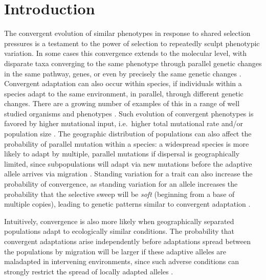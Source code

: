 \documentclass{article}
\newcommand{\citep}[1]{\cite{#1}}
\begin{document}
\section*{Introduction}


The convergent evolution of similar phenotypes 
in response to shared selection pressures is a testament to the power of selection 
to repeatedly sculpt phenotypic variation. 
In some cases this convergence extends to the molecular level, 
with disparate taxa converging to the same phenotype through parallel 
genetic changes in the same pathway, genes, 
or even by precisely the same genetic changes
\citep{stern2013genetic,zhen2012parallel,martin2013repeated}. 
Convergent adaptation can also occur within species, if individuals within a species 
adapt to the same environment, in parallel, through different genetic changes. 
There are a growing number of examples of this in a range of well studied organisms and phenotypes \citep{Arendt:08}.
Such evolution of convergent phenotypes is favored by higher mutational input, 
i.e.\ higher total mutational rate and/or population size \citep{softsweepsII}.
The geographic distribution of populations can also affect the probability of parallel mutation within a species:
a widespread species is more likely to adapt by multiple, parallel mutations if dispersal is geographically limited, 
since subpopulations will adapt via new mutations before the adaptive allele arrives via migration \citep{ralph2010parallel}. 
Standing variation for a trait can also increase the probability of convergence, 
as standing variation for an allele increases the probability that the selective sweep will be \emph{soft}
(beginning from a base of multiple copies),
leading to genetic patterns similar to convergent adaptation \citep{orr2001sieve,softsweepsI}. 

Intuitively, convergence is also more likely 
when geographically separated populations adapt to ecologically similar conditions. 
The probability that convergent adaptations arise independently
before adaptations spread between the populations by migration
will be larger if these adaptive alleles are maladapted in intervening environments,
since such adverse conditions can strongly restrict the spread of locally adapted alleles \citep{slatkin1973geneflow}.
 
\end{document}
